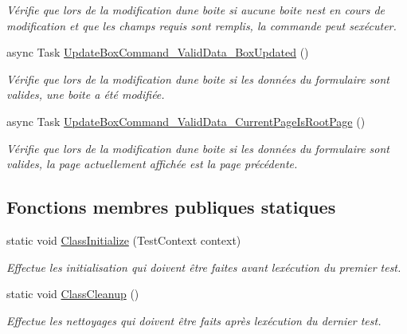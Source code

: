 \begin{DoxyCompactItemize}
\begin{DoxyCompactList}\small\item\em Vérifie que lors de la modification d\textquotesingle{}une boite si aucune boite n\textquotesingle{}est en cours de modification et que les champs requis sont remplis, la commande peut s\textquotesingle{}exécuter. \end{DoxyCompactList}\item 
async Task \hyperlink{class_boxes_1_1_tests_1_1_edit_box_view_model_tests_a0ec96e5e74737ec4eb9c4c2bedc2ba61}{Update\+Box\+Command\+\_\+\+Valid\+Data\+\_\+\+Box\+Updated} ()
\begin{DoxyCompactList}\small\item\em Vérifie que lors de la modification d\textquotesingle{}une boite si les données du formulaire sont valides, une boite a été modifiée. \end{DoxyCompactList}\item 
async Task \hyperlink{class_boxes_1_1_tests_1_1_edit_box_view_model_tests_a727e78f15ae3fcd2aefd3a11f1b9af47}{Update\+Box\+Command\+\_\+\+Valid\+Data\+\_\+\+Current\+Page\+Is\+Root\+Page} ()
\begin{DoxyCompactList}\small\item\em Vérifie que lors de la modification d\textquotesingle{}une boite si les données du formulaire sont valides, la page actuellement affichée est la page précédente. \end{DoxyCompactList}\end{DoxyCompactItemize}
\subsection*{Fonctions membres publiques statiques}
\begin{DoxyCompactItemize}
\item 
static void \hyperlink{class_boxes_1_1_tests_1_1_edit_box_view_model_tests_a4693e24484d236f36cb9fefdfb6cf511}{Class\+Initialize} (Test\+Context context)
\begin{DoxyCompactList}\small\item\em Effectue les initialisation qui doivent être faites avant l\textquotesingle{}exécution du premier test. \end{DoxyCompactList}\item 
static void \hyperlink{class_boxes_1_1_tests_1_1_edit_box_view_model_tests_a2ca5e0773d00635ef3db4860e36e2917}{Class\+Cleanup} ()
\begin{DoxyCompactList}\small\item\em Effectue les nettoyages qui doivent être faits après l\textquotesingle{}exécution du dernier test. \end{DoxyCompactList}\end{DoxyCompactItemize}
